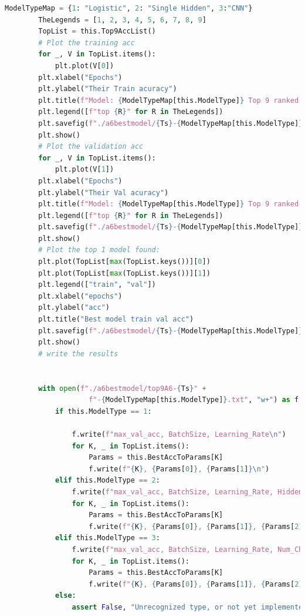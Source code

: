 \documentclass[]{article}
\begin{document}
\begin{lstlisting}[language=python]
        ModelTypeMap = {1: "Logistic", 2: "Single Hidden", 3:"CNN"}
        TheLegends = [1, 2, 3, 4, 5, 6, 7, 8, 9]
        TopList = this.Top9AccList()
        # Plot the training acc
        for _, V in TopList.items():
            plt.plot(V[0])
        plt.xlabel("Epochs")
        plt.ylabel("Their Train acuracy")
        plt.title(f"Model: {ModelTypeMap[this.ModelType]} Top 9 ranked by peak val acc")
        plt.legend([f"top {R}" for R in TheLegends])
        plt.savefig(f"./a6bestmodel/{Ts}-{ModelTypeMap[this.ModelType]}-train-acc.png")
        plt.show()
        # Plot the validation acc
        for _, V in TopList.items():
            plt.plot(V[1])
        plt.xlabel("Epochs")
        plt.ylabel("Their Val acuracy")
        plt.title(f"Model: {ModelTypeMap[this.ModelType]} Top 9 ranked by peak val acc")
        plt.legend([f"top {R}" for R in TheLegends])
        plt.savefig(f"./a6bestmodel/{Ts}-{ModelTypeMap[this.ModelType]}-val-acc.png")
        plt.show()
        # Plot the top 1 model found:
        plt.plot(TopList[max(TopList.keys())][0])
        plt.plot(TopList[max(TopList.keys())][1])
        plt.legend(["train", "val"])
        plt.xlabel("epochs")
        plt.ylabel("acc")
        plt.title("Best model train val acc")
        plt.savefig(f"./a6bestmodel/{Ts}-{ModelTypeMap[this.ModelType]}-best-acc.png")
        plt.show()
        # write the results


        with open(f"./a6bestmodel/top9A6-{Ts}" +
                    f"-{ModelTypeMap[this.ModelType]}.txt", "w+") as f:
            if this.ModelType == 1:

                f.write(f"max_val_acc, BatchSize, Learning_Rate\n")
                for K, _ in TopList.items():
                    Params = this.BestAccToParams[K]
                    f.write(f"{K}, {Params[0]}, {Params[1]}\n")
            elif this.ModelType == 2:
                f.write(f"max_val_acc, BatchSize, Learning_Rate, Hidden_Layer_width\n")
                for K, _ in TopList.items():
                    Params = this.BestAccToParams[K]
                    f.write(f"{K}, {Params[0]}, {Params[1]}, {Params[2]}\n")
            elif this.ModelType == 3:
                f.write(f"max_val_acc, BatchSize, Learning_Rate, Num_Channels, Conv_Kernel, MaxPool_Kernel\n")
                for K, _ in TopList.items():
                    Params = this.BestAccToParams[K]
                    f.write(f"{K}, {Params[0]}, {Params[1]}, {Params[2]}, {Params[3]}, {Params[4]}\n")
            else:
                assert False, "Unrecognized type, or not yet implemented"





\end{lstlisting}
\end{document}
